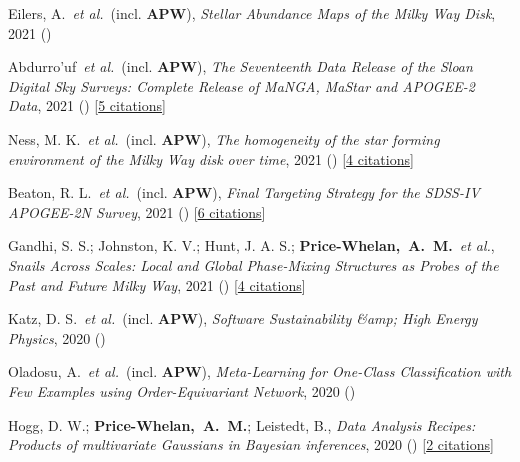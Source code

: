 \item[{\color{deemph}\scriptsize14}]Eilers, A.~\textit{et al.}~(incl. \textbf{APW}), \textit{Stellar Abundance Maps of the Milky Way Disk}, 2021 ()

\item[{\color{deemph}\scriptsize13}]Abdurro'uf~\textit{et al.}~(incl. \textbf{APW}), \textit{The Seventeenth Data Release of the Sloan Digital Sky Surveys: Complete Release of MaNGA, MaStar and APOGEE-2 Data}, 2021 () [\href{http://adsabs.harvard.edu/abs/2021arXiv211202026A}{5 citations}]

\item[{\color{deemph}\scriptsize12}]Ness, M. K.~\textit{et al.}~(incl. \textbf{APW}), \textit{The homogeneity of the star forming environment of the Milky Way disk over time}, 2021 () [\href{http://adsabs.harvard.edu/abs/2021arXiv210905722N}{4 citations}]

\item[{\color{deemph}\scriptsize11}]Beaton, R. L.~\textit{et al.}~(incl. \textbf{APW}), \textit{Final Targeting Strategy for the SDSS-IV APOGEE-2N Survey}, 2021 () [\href{http://adsabs.harvard.edu/abs/2021arXiv210811907B}{6 citations}]

\item[{\color{deemph}\scriptsize10}]Gandhi, S. S.; Johnston, K. V.; Hunt, J. A. S.; \textbf{Price-Whelan,~A.~M.}~\textit{et al.}, \textit{Snails Across Scales: Local and Global Phase-Mixing Structures as Probes of the Past and Future Milky Way}, 2021 () [\href{http://adsabs.harvard.edu/abs/2021arXiv210703562G}{4 citations}]

\item[{\color{deemph}\scriptsize9}]Katz, D. S.~\textit{et al.}~(incl. \textbf{APW}), \textit{Software Sustainability {\&}amp; High Energy Physics}, 2020 ()

\item[{\color{deemph}\scriptsize8}]Oladosu, A.~\textit{et al.}~(incl. \textbf{APW}), \textit{Meta-Learning for One-Class Classification with Few Examples using Order-Equivariant Network}, 2020 ()

\item[{\color{deemph}\scriptsize7}]Hogg, D. W.; \textbf{Price-Whelan,~A.~M.}; Leistedt, B., \textit{Data Analysis Recipes: Products of multivariate Gaussians in Bayesian inferences}, 2020 () [\href{http://adsabs.harvard.edu/abs/2020arXiv200514199H}{2 citations}]

